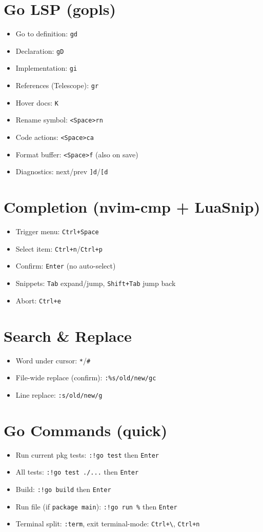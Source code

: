 \documentclass[9pt,twocolumn]{extarticle}
\newcommand{\key}[1]{\mbox{\texttt{#1}}}
\newcommand{\leader}{\key{<Space>}} %
\begin{document}
\section{Go LSP (gopls)}
\begin{itemize}
  \item Go to definition: \key{gd}
  \item Declaration: \key{gD}
  \item Implementation: \key{gi}
  \item References (Telescope): \key{gr}
  \item Hover docs: \key{K}
  \item Rename symbol: \leader\key{rn}
  \item Code actions: \leader\key{ca}
  \item Format buffer: \leader\key{f} (also on save)
  \item Diagnostics: next/prev \key{]d}/\key{[d}
\end{itemize}

\section{Completion (nvim-cmp + LuaSnip)}
\begin{itemize}
  \item Trigger menu: \key{Ctrl+Space}
  \item Select item: \key{Ctrl+n}/\key{Ctrl+p}
  \item Confirm: \key{Enter} (no auto-select)
  \item Snippets: \key{Tab} expand/jump, \key{Shift+Tab} jump back
  \item Abort: \key{Ctrl+e}
\end{itemize}

\section{Search \& Replace}
\begin{itemize}
  \item Word under cursor: \key{*}/\key{\#}
  \item File-wide replace (confirm): \key{:\%s/old/new/gc}
  \item Line replace: \key{:s/old/new/g}
\end{itemize}

\section{Go Commands (quick)}
\begin{itemize}
  \item Run current pkg tests: \key{:!go test} then \key{Enter}
  \item All tests: \key{:!go test ./...} then \key{Enter}
  \item Build: \key{:!go build} then \key{Enter}
  \item Run file (if \texttt{package main}): \key{:!go run \%} then \key{Enter}
  \item Terminal split: \key{:term}, exit terminal-mode: \key{Ctrl+\textbackslash}, \key{Ctrl+n}
\end{itemize}
\end{document}
